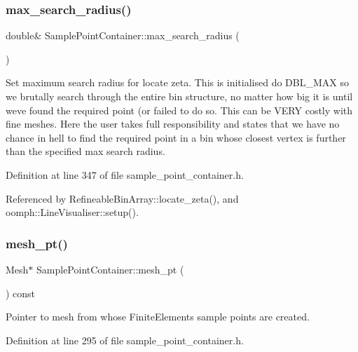 \subsubsection{\texorpdfstring{max\+\_\+search\+\_\+radius()}{max\_search\_radius()}}
{\footnotesize\ttfamily double\& Sample\+Point\+Container\+::max\+\_\+search\+\_\+radius (\begin{DoxyParamCaption}{ }\end{DoxyParamCaption})\hspace{0.3cm}{\ttfamily [inline]}}



Set maximum search radius for locate zeta. This is initialised do D\+B\+L\+\_\+\+M\+AX so we brutally search through the entire bin structure, no matter how big it is until we\textquotesingle{}ve found the required point (or failed to do so. This can be V\+E\+RY costly with fine meshes. Here the user takes full responsibility and states that we have no chance in hell to find the required point in a bin whose closest vertex is further than the specified max search radius. 



Definition at line 347 of file sample\+\_\+point\+\_\+container.\+h.



Referenced by Refineable\+Bin\+Array\+::locate\+\_\+zeta(), and oomph\+::\+Line\+Visualiser\+::setup().

\mbox{\label{classSamplePointContainer_ae170916821b5f8f00255d251cd7f2d8c}} 
\subsubsection{\texorpdfstring{mesh\+\_\+pt()}{mesh\_pt()}}
{\footnotesize\ttfamily Mesh$\ast$ Sample\+Point\+Container\+::mesh\+\_\+pt (\begin{DoxyParamCaption}{ }\end{DoxyParamCaption}) const\hspace{0.3cm}{\ttfamily [inline]}}



Pointer to mesh from whose Finite\+Elements sample points are created. 



Definition at line 295 of file sample\+\_\+point\+\_\+container.\+h.

